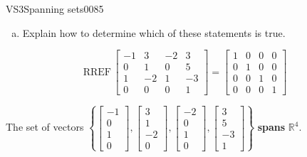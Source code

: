 \begin{exercise}{VS3}{Spanning sets}{0085}
\begin{exerciseStatement}
\begin{enumerate}[(a)]
\begin{itemize}
 
\end{itemize}

     
\item  

 Explain how to determine which of these statements is true. 

 
\end{enumerate}

     \end{exerciseStatement}
 \begin{exerciseAnswer} 

 \[
\mathrm{RREF}\, \left[\begin{array}{cccc}
-1 & 3 & -2 & 3 \\
0 & 1 & 0 & 5 \\
1 & -2 & 1 & -3 \\
0 & 0 & 0 & 1
\end{array}\right] = \left[\begin{array}{cccc}
1 & 0 & 0 & 0 \\
0 & 1 & 0 & 0 \\
0 & 0 & 1 & 0 \\
0 & 0 & 0 & 1
\end{array}\right]
            \] 

 

 The set of vectors \(\left\{ \left[\begin{array}{c}
-1 \\
0 \\
1 \\
0
\end{array}\right] , \left[\begin{array}{c}
3 \\
1 \\
-2 \\
0
\end{array}\right] , \left[\begin{array}{c}
-2 \\
0 \\
1 \\
0
\end{array}\right] , \left[\begin{array}{c}
3 \\
5 \\
-3 \\
1
\end{array}\right] \right\}\) \textbf{spans} \(\mathbb{R}^4\). 

 \end{exerciseAnswer}
 \end{exercise}



